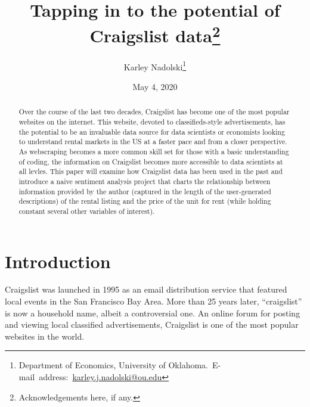 \documentclass[12pt,english]{article}
\begin{document}
\begin{singlespace}
\title{Tapping in to the potential of Craigslist data\thanks{Acknowledgements here, if any.}}
\end{singlespace}

\author{Karley Nadolski\thanks{Department of Economics, University of Oklahoma.\
E-mail~address:~\href{mailto:karley.j.nadolski@ou.edu}{karley.j.nadolski@ou.edu}}}

\date{May 4, 2020}

\maketitle

\begin{abstract}
\begin{singlespace}
Over the course of the last two decades, Craigslist has become one of the most popular websites on the internet. This website, devoted to classifieds-style advertisements, has the potential to be an invaluable data source for data scientists or economists looking to understand rental markets in the US at a faster pace and from a closer perspective. As webscraping becomes a more common skill set for those with a basic understanding of coding, the information on Craigslist becomes more accessible to data scientists at all levles. This paper will examine how Craigslist data has been used in the past and introduce a naive sentiment analysis project that charts the relationship between information provided by the author (captured in the length of the user-generated descriptions) of the rental listing and the price of the unit for rent (while holding constant several other variables of interest).  
\end{singlespace}

\end{abstract}
\vfill{}


\pagebreak{}


\section{Introduction}\label{sec:intro}

Craigslist was launched in 1995 as an email distribution service that featured local events in the San Francisco Bay Area. More than 25 years later, “craigslist” is now a household name, albeit a controversial one. An online forum for posting and viewing local classified advertisements, Craigslist is one of the most popular websites in the world. 
\end{document}
